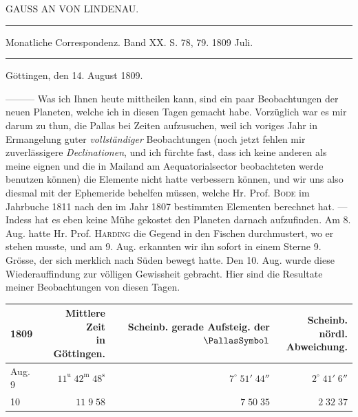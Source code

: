 \par\bigskip
{}
\begin{center}\large GAUSS AN VON LINDENAU.\end{center}
\begin{center}\parbox{.80\linewidth}{\centering\footnotesize\frenchspacing
\hrule height .3pt\relax\vspace{2.5pt}
Monatliche Correspondenz. Band XX. S. 78, 79. 1809 Juli.\par
\vspace{2.5pt}\hrule height .3pt\relax
}\end{center}
\begin{flushright} Göttingen, den 14. August 1809.
\end{flushright}

\par\indent ---\enspace---\enspace--- Was ich Ihnen heute mittheilen kann, sind ein paar Beobachtungen der neuen Planeten, welche ich in diesen Tagen gemacht habe. Vorzüglich war es mir darum zu thun, die Pallas bei Zeiten aufzusuchen, weil ich voriges Jahr in Ermangelung guter \emph{vollständiger} Beobachtungen (noch jetzt fehlen mir zuverlässigere \emph{Declinationen}, und ich fürchte fast, dass ich keine anderen als meine eignen und die in Mailand am Aequatorialsector beobachteten werde benutzen können) die Elemente nicht hatte verbessern können, und wir uns also diesmal mit der Ephemeride behelfen müssen, welche Hr. Prof.
\textsc{Bode} im Jahrbuche 1811 nach den im Jahr 1807 bestimmten Elementen berechnet hat. --- Indess hat es eben keine Mühe gekostet den Planeten darnach aufzufinden. Am 8. Aug. hatte Hr. Prof.
\textsc{Harding} die Gegend in den Fischen durchmustert, wo er stehen musste, und am 9. Aug. erkannten wir ihn sofort in einem Sterne 9. Grösse, der sich merklich nach Süden bewegt hatte. Den 10. Aug. wurde diese Wiederauffindung zur völligen Gewissheit gebracht. Hier sind die Resultate meiner Beobachtungen von diesen Tagen.


\begin{center}\fontsize{9}{11}\selectfont\setlength{\tabcolsep}{5pt}\renewcommand{\arraystretch}{1.15}\begin{tabular}{lrrr} 1809 & \shortstack{Mittlere Zeit\\in Göttingen.} & \shortstack{Scheinb. gerade\\Aufsteig. der $\PallasSymbol$} & \shortstack{Scheinb. nördl.\\Abweichung.}\\\hline Aug. 9 & $11^{\text{u}}\;42^{\text{m}}\;48^{\text{s}}$ & $7^\circ\;51'\;44''$ & $2^\circ\;41'\;6''$\\ 10 & $11\;9\;58$ & $7\;50\;35$ & $2\;32\;37$\\
\end{tabular}\end{center}


